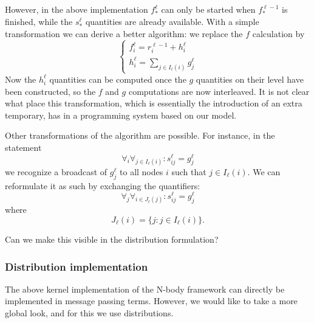 However, in the above implementation $f^\ell_*$ can only be started
when $f^{\ell-1}_*$ is finished, while the $s^\ell_*$ quantities are
already available.
With a simple transformation we can
derive a better algorithm: we replace the $f$ calculation by
\[ 
\begin{cases}
  f^\ell_i = r_i^{\ell-1} + h^\ell_i\\
  h^\ell_i = \sum_{j\in I_\ell(i)} g^\ell_j
\end{cases}
\]
Now the $h^\ell_i$ quantities can be computed once
the $g$ quantities on their level have been constructed, so the $f$
and $g$ computations are now interleaved. It is not clear what place
this transformation, which is essentially the introduction of an extra
temporary, has in a programming system based on our model.

Other transformations of the algorithm are possible. For instance, in
the statement
\[ \forall_i\forall_{j\in I_\ell(i)}\colon
  s^\ell_{ij} = g^\ell_j
\] 
we recognize a broadcast of $g^\ell_j$ to all nodes $i$ such that
$j\in I_\ell(i)$. We can reformulate it as such by exchanging the quantifiers:
\[ \forall_j \forall_{i\in J_\ell(j)}\colon 
  s^\ell_{ij} = g^\ell_j
\] 
where
\[ J_\ell(i) = \{ j\colon j\in I_\ell(i) \}. \]
\begin{impquestion}
  Can we make this visible in the distribution formulation?
\end{impquestion}


\subsubsection{Distribution implementation}
\label{sec:bh-kernel}

The above kernel implementation of the N-body framework can directly
be implemented in message passing terms. However, we would like to
take a more global look, and for this we use distributions.

